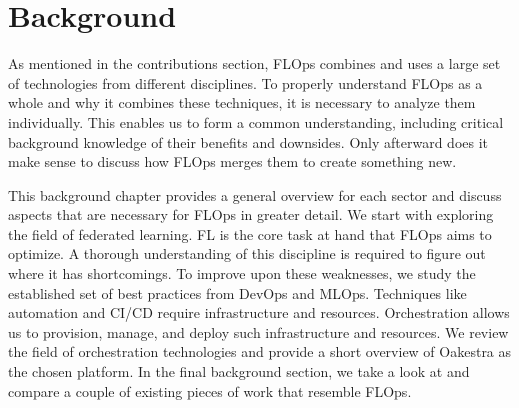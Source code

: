 \chapter{Background}\label{chapter:background}

As mentioned in the contributions section, FLOps combines and uses a large set of technologies from
different disciplines. To properly understand FLOps as a whole and why it combines these techniques,
it is necessary to analyze them individually.
This enables us to form a common understanding, including critical background knowledge of their benefits and downsides.
Only afterward does it make sense to discuss how FLOps merges them to create something new.

This background chapter provides a general overview for each sector and discuss aspects that
are necessary for FLOps in greater detail.
We start with exploring the field of federated learning.
FL is the core task at hand that FLOps aims to optimize.
A thorough understanding of this discipline is required to figure out where it has shortcomings.
To improve upon these weaknesses, we study the established set of 
best practices from DevOps and MLOps.
Techniques like automation and CI/CD require infrastructure and resources.
Orchestration allows us to provision, manage, and deploy such infrastructure and resources.
We review the field of orchestration technologies and provide a short
overview of Oakestra \cite{paper:oakestra_usenix} as the chosen platform.
In the final background section, we take a look at and compare a couple of existing pieces of work
that resemble FLOps.








